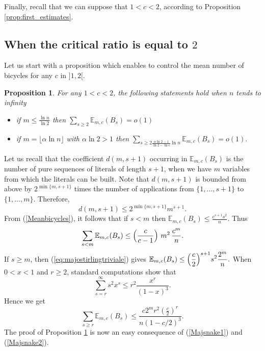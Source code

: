 \documentclass[aop,noinfoline]{imsart}
\newtheorem{proposition}[theorem]{Proposition}
\renewcommand{\Box}{{\vrule width0.6ex height1em depth0cm}}
\newenvironment{proof}{\noindent{\bf Proof:}}{\hfill \Box}
\newcommand{\EE}{\mathbb{E}}
\begin{document}
Finally,  recall that we can  suppose that $1<c<2$, according to  Proposition \ref{prop:first_estimates}. 

\subsection{When the critical ratio is equal to $2$}\label{subsec:c=2}

Let us start with a proposition which enables to control the mean
number of bicycles for any $c$ in $]1,2[$.

\begin{proposition}\label{prop:bicyclebound}
 For any $1<c<2$, the following statements hold when  $n$ tends to  infinity 
\begin{itemize}
\item 
if  $\displaystyle m\leq\frac{\ln n}{\ln 2}$ then  
$\displaystyle \sum_{s\geq 2}\EE_{m,c} (B_s) = o(1)$

\item  if $m=\lfloor \alpha \ln n\rfloor$  with $\alpha \ln 2 >1$ then $\displaystyle
  \sum_{s\ge 2\frac{\alpha \ln 2 -1}{\ln 2 -\ln c} \ln n }\EE_{m,c} (B_s) = o(1).$  
\end{itemize}
\end{proposition}
\begin{proof}
Let us recall that the coefficient $d(m,s+1)$ occurring in $\EE_{m,c} (B_s)$ is  the number of pure sequences of literals of length
  $s+1$, when we have   $m$ variables from which the literals can be
  built.   Note that $d(m,s+1)$ is bounded
from above by $2^{\min\{m,s+1\}}$ times the number of applications
from $\{1,\ldots,s+1\}$ to $\{1,\ldots,m\}$. Therefore,
\begin{equation}
  \label{eq:majostirlingtriviale} d(m,s+1)\leq
  2^{\min\{m,s+1\}}m^{s+1}.
\end{equation}
From (\ref{Meanbicycles}),  it follows that  if   $s<m$ then  $\displaystyle  \EE_{m,c} (B_s) \leq \frac{c^{s+1} s^2 }{n}$. Thus 
\begin{equation}\label{Majsnake1}
\sum_{s<m} \EE_{m,c}(B_s)    \leq \Bigl ( \frac{c}{c-1} \Bigr ) \ m^2 \, \frac{c^m}{n}.
 \end{equation}
If $s\ge m$,  then (\ref{eq:majostirlingtriviale}) gives $\displaystyle \EE_{m,c} (B_s) \leq \Bigl (\frac{c}{2}\Bigr )^{s+1} s^2  \frac{2^m }{n}.$ When $0<x<1$ and $r\geq 2$, standard computations show
that
\begin{equation}
  \label{eqn:majosumcarree} \sum_{s=r}^{\infty}s^2x^s\leq
  r^2\frac{x^r}{(1-x)^3}.
\end{equation}
Hence  we get 
\begin{equation}\label{Majsnake2} 
 \sum_{s\ge r} \EE_{m,c}(B_s)   \leq\frac{c2^mr^2\left(\frac{c}{2}\right)^r}{n(1-c/2)^3} . 
\end{equation}
The proof  of  Proposition \ref{prop:bicyclebound}  is now an easy consequence of  (\ref{Majsnake1}) and (\ref{Majsnake2}). 
 \end{proof}
\end{document}

